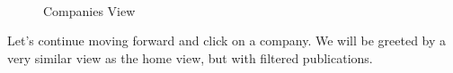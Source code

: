 \begin{figure}[H]
        \myfloatalign
         \quad
         \\
        \caption[Companies View]{Companies View}
\end{figure}

Let's continue moving forward and click on a company. We will be greeted by a very similar view as the home view, but with filtered publications.

